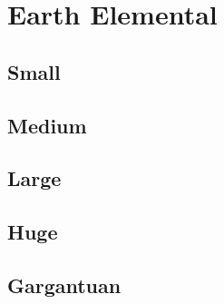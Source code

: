 \section{Earth Elemental}

\subsection{Small}

\subsection{Medium}

\subsection{Large}

\subsection{Huge}

\subsection{Gargantuan}